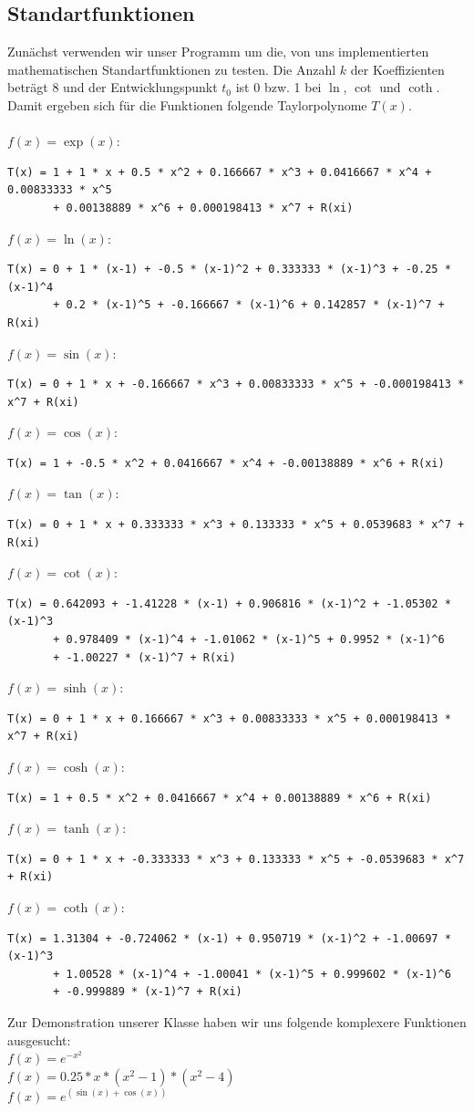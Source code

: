 \documentclass{scrartcl}
\begin{document}
	\subsection{Standartfunktionen}
Zunächst verwenden wir unser Programm um die, von uns implementierten mathematischen Standartfunktionen zu testen. Die Anzahl $k$ der Koeffizienten beträgt 8 und der Entwicklungspunkt $t_0$ ist 0 bzw. 1 bei $\ln$, $\cot$ und $\coth$. Damit ergeben sich für die Funktionen folgende Taylorpolynome $T(x)$.\\
\\
$f(x)=\exp(x)$:
\begin{verbatim}
T(x) = 1 + 1 * x + 0.5 * x^2 + 0.166667 * x^3 + 0.0416667 * x^4 + 0.00833333 * x^5
       + 0.00138889 * x^6 + 0.000198413 * x^7 + R(xi)
\end{verbatim}
$f(x)=\ln(x)$:
\begin{verbatim}
T(x) = 0 + 1 * (x-1) + -0.5 * (x-1)^2 + 0.333333 * (x-1)^3 + -0.25 * (x-1)^4
       + 0.2 * (x-1)^5 + -0.166667 * (x-1)^6 + 0.142857 * (x-1)^7 + R(xi)
\end{verbatim}
$f(x)=\sin(x)$:
\begin{verbatim}
T(x) = 0 + 1 * x + -0.166667 * x^3 + 0.00833333 * x^5 + -0.000198413 * x^7 + R(xi)
\end{verbatim}
$f(x)=\cos(x)$:
\begin{verbatim}
T(x) = 1 + -0.5 * x^2 + 0.0416667 * x^4 + -0.00138889 * x^6 + R(xi)
\end{verbatim}
$f(x)=\tan(x)$:
\begin{verbatim}
T(x) = 0 + 1 * x + 0.333333 * x^3 + 0.133333 * x^5 + 0.0539683 * x^7 + R(xi)
\end{verbatim}
$f(x)=\cot(x)$:
\begin{verbatim}
T(x) = 0.642093 + -1.41228 * (x-1) + 0.906816 * (x-1)^2 + -1.05302 * (x-1)^3
       + 0.978409 * (x-1)^4 + -1.01062 * (x-1)^5 + 0.9952 * (x-1)^6
       + -1.00227 * (x-1)^7 + R(xi)
\end{verbatim}
$f(x)=\sinh(x)$:
\begin{verbatim}
T(x) = 0 + 1 * x + 0.166667 * x^3 + 0.00833333 * x^5 + 0.000198413 * x^7 + R(xi)
\end{verbatim}
$f(x)=\cosh(x)$:
\begin{verbatim}
T(x) = 1 + 0.5 * x^2 + 0.0416667 * x^4 + 0.00138889 * x^6 + R(xi)
\end{verbatim}
$f(x)=\tanh(x)$:
\begin{verbatim}
T(x) = 0 + 1 * x + -0.333333 * x^3 + 0.133333 * x^5 + -0.0539683 * x^7 + R(xi)
\end{verbatim}
$f(x)=\coth(x)$:
\begin{verbatim}
T(x) = 1.31304 + -0.724062 * (x-1) + 0.950719 * (x-1)^2 + -1.00697 * (x-1)^3
       + 1.00528 * (x-1)^4 + -1.00041 * (x-1)^5 + 0.999602 * (x-1)^6
       + -0.999889 * (x-1)^7 + R(xi)
\end{verbatim}
\newpage
\noindent Zur Demonstration unserer Klasse haben wir uns folgende komplexere Funktionen ausgesucht:\\
$f(x)=e^{-x^2}$\\
$f(x)=0.25*x*(x^2-1)*(x^2-4)$\\
$f(x)=e^{(\sin(x)+\cos(x))}$
\end{document}
